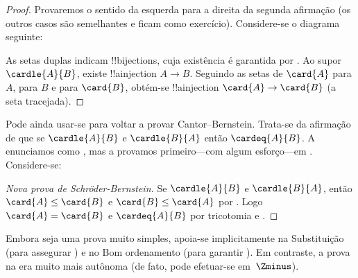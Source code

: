 \documentclass[../../../include/open-logic-section]{subfiles}
\begin{document}
\begin{proof}
Provaremos o sentido da esquerda para a direita da segunda afirmação (os
outros casos são semelhantes e ficam como exercício). Considere-se
o diagrama seguinte:
\begin{center}
\end{center}
As setas duplas indicam !!{bijection}s, cuja existência é
garantida por . Ao supor
$\cardle{A}{B}$, existe !!a{injection}  $A\to B$. Seguindo
as setas de $\card{A}$ para $A$, para $B$ e para $\card{B}$,
obtém-se !!a{injection} $\card{A} \to \card{B}$ (a seta tracejada).
\end{proof}\noindent Pode ainda usar-se 
para voltar a provar Cantor--Bernstein. Trata-se da afirmação de que se
$\cardle{A}{B}$ e $\cardle{B}{A}$ então $\cardeq{A}{B}$. A enunciamos
como , mas a provamos primeiro---com algum esforço---em .
Considere-se:

\begin{proof}[Nova prova de Schr\"oder-Bernstein]
Se $\cardle{A}{B}$ e $\cardle{B}{A}$, então $\card{A} \leq \card{B}$
e $\card{B} \leq \card{A}$ por . Logo
$\card{A} = \card{B}$ e $\cardeq{A}{B}$ por tricotomia e
.
\end{proof}
\noindent
Embora seja uma prova muito simples, apoia-se implicitamente na Substituição (para assegurar
) e no
Bom ordenamento (para garantir ). Em
contraste, a prova na  era muito
mais autônoma (de fato, pode efetuar-se em~$\Zminus$).
\end{document}
